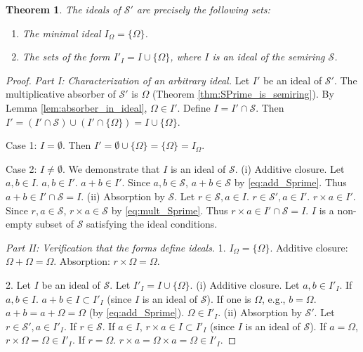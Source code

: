 \documentclass[11pt, a4paper]{article}
\theoremstyle{plain}
\newtheorem{theorem}{Theorem}[section]
\theoremstyle{definition}
\numberwithin{equation}{section}
\newcommand{\OmegaObj}{\Omega} %
\newcommand{\SemiringS}{\mathcal{S}}
\newcommand{\SemiringSPrime}{\mathcal{S}'}
\begin{document}
\begin{theorem}\label{thm:ideal_structure_SPrime}
The ideals of $\SemiringSPrime$ are precisely the following sets:
\begin{enumerate}
    \item The minimal ideal $I_{\OmegaObj} = \{\OmegaObj\}$.
    \item The sets of the form $I'_I = I \cup \{\OmegaObj\}$, where $I$ is an ideal of the semiring $\SemiringS$.
\end{enumerate}
\end{theorem}
\begin{proof}
\textit{Part I: Characterization of an arbitrary ideal.}
Let $I'$ be an ideal of $\SemiringSPrime$. The multiplicative absorber of $\SemiringSPrime$ is $\OmegaObj$ (Theorem \ref{thm:SPrime_is_semiring}). By Lemma \ref{lem:absorber_in_ideal}, $\OmegaObj \in I'$.
Define $I = I' \cap \SemiringS$. Then $I' = (I' \cap \SemiringS) \cup (I' \cap \{\OmegaObj\}) = I \cup \{\OmegaObj\}$.

Case 1: $I = \emptyset$. Then $I' = \emptyset \cup \{\OmegaObj\} = \{\OmegaObj\} = I_{\OmegaObj}$.

Case 2: $I \neq \emptyset$. We demonstrate that $I$ is an ideal of $\SemiringS$.
(i) Additive closure. Let $a, b \in I$. $a, b \in I'$. $a+b \in I'$. Since $a, b \in \SemiringS$, $a+b \in \SemiringS$ by \eqref{eq:add_Sprime}. Thus $a+b \in I' \cap \SemiringS = I$.
(ii) Absorption by $\SemiringS$. Let $r \in \SemiringS, a \in I$. $r \in \SemiringSPrime, a \in I'$. $r\times a \in I'$. Since $r, a \in \SemiringS$, $r\times a \in \SemiringS$ by \eqref{eq:mult_Sprime}. Thus $r\times a \in I' \cap \SemiringS = I$.
$I$ is a non-empty subset of $\SemiringS$ satisfying the ideal conditions.

\textit{Part II: Verification that the forms define ideals.}
1. $I_{\OmegaObj} = \{\OmegaObj\}$. Additive closure: $\OmegaObj+\OmegaObj=\OmegaObj$. Absorption: $r\times\OmegaObj=\OmegaObj$.

2. Let $I$ be an ideal of $\SemiringS$. Let $I'_I = I \cup \{\OmegaObj\}$.
(i) Additive closure. Let $a, b \in I'_I$.
If $a, b \in I$. $a+b \in I \subset I'_I$ (since $I$ is an ideal of $\SemiringS$).
If one is $\OmegaObj$, e.g., $b=\OmegaObj$. $a+b = a+\OmegaObj = \OmegaObj$ (by \eqref{eq:add_Sprime}). $\OmegaObj \in I'_I$.
(ii) Absorption by $\SemiringSPrime$. Let $r \in \SemiringSPrime, a \in I'_I$.
If $r \in \SemiringS$. If $a \in I$, $r\times a \in I \subset I'_I$ (since $I$ is an ideal of $\SemiringS$). If $a=\OmegaObj$, $r\times\OmegaObj = \OmegaObj \in I'_I$.
If $r=\OmegaObj$. $r\times a = \OmegaObj\times a = \OmegaObj \in I'_I$.
\end{proof}
\end{document}

